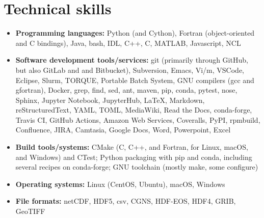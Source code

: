 \section{Technical skills}
\vspace{0.5em}

\begin{itemize}

  \item \textbf{Programming languages:} Python (and Cython),
    Fortran (object-oriented and C bindings), Java, bash,
    IDL, C++, C, MATLAB, Javascript, NCL

  \item \textbf{Software development tools/services:} git (primarily through
    GitHub, but also GitLab and and Bitbucket), Subversion, Emacs,
    Vi/m, VSCode, Eclipse, Slurm, TORQUE, Portable Batch System,
    GNU compilers (gcc and gfortran), Docker, grep, find, sed,
    ant, maven, pip, conda, pytest, nose, Sphinx, Jupyter Notebook, JupyterHub, \LaTeX,
    Markdown, reStructuredText, YAML, TOML, MediaWiki, Read the Docs,
    conda-forge, {Travis CI}, {GitHub Actions}, {Amazon Web Services},
    Coveralls, PyPI, rpmbuild, Confluence, JIRA, Camtasia, Google Docs, Word,
    Powerpoint, Excel

  \item \textbf{Build tools/systems:} CMake (C, C++, and Fortran, for Linux, macOS,
    and Windows) and CTest; Python packaging with pip and conda, including
    several recipes on conda-forge; GNU toolchain (mostly make, some configure)

  \item \textbf{Operating systems:} Linux (CentOS, Ubuntu), macOS, Windows

  \item \textbf{File formats:} netCDF, HDF5, csv, CGNS, HDF-EOS, HDF4, GRIB, GeoTIFF

\end{itemize}

